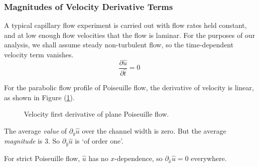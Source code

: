 \documentclass[12pt, a4paper, twoside, openright]{book}
\begin{document}
\subsubsection{Magnitudes of Velocity Derivative Terms}

A typical capillary flow experiment is carried out with flow rates held constant, and at low enough flow velocities that the flow is laminar.
For the purposes of our analysis, we shall assume steady non-turbulent flow,
so the time-dependent velocity term vanishes.
\begin{equation}
\frac{\partial \hat{u}}{\partial \hat{t}} = 0
\end{equation}


For the parabolic flow profile of Poiseuille flow, the derivative of velocity is linear, as shown in Figure (\ref{poisedrv1}).
\begin{figure}[ht]
\centering
{}
\caption{Velocity first derivative of plane Poiseuille flow.}\label{poisedrv1}
\end{figure}

The average \emph{value} of $\partial_y \hat{u}$ over the channel width is zero.  But the average \emph{magnitude} is 3.  
So $\partial_{\hat{y}} \hat{u}$ is `of order one'.

For strict Poiseuille flow, $\hat{u}$ has no $x$-dependence, so $\partial_{\hat{x}} \hat{u} = 0$ everywhere.

\end{document}
